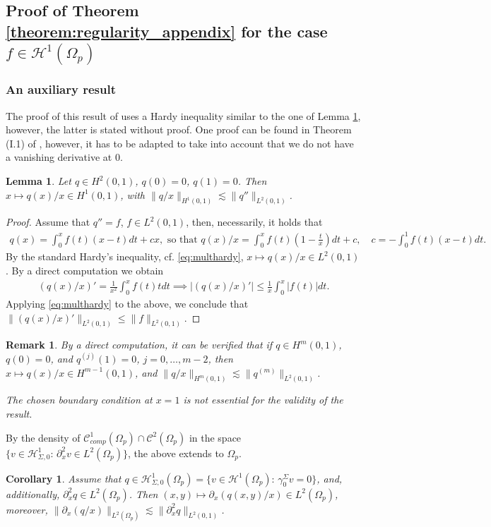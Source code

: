 \documentclass[report]{elsarticle}
\newtheorem{corollary}[theorem]{Corollary}
\newtheorem{lemma}[theorem]{Lemma}
\newtheorem{remark}[theorem]{Remark}
\numberwithin{theorem}{section}
\begin{document}
\subsection{Proof of Theorem \ref{theorem:regularity_appendix} for the case $f\in \mathcal{H}^1(\Omega_p)$}
\subsubsection{An auxiliary result}
The proof of this result of \cite{baouendi_goulaouic} uses a Hardy inequality similar to the one of Lemma \ref{lem:hardy_ho}, however, the latter is stated without proof. One proof can be found in Theorem (I.1) of \cite{baouendi}, however, it has to be adapted to take into account that we do not have a vanishing derivative at $0$.
\begin{lemma}
	\label{lem:hardy_ho}
	Let $q\in H^2(0,1)$, $q(0)=0$, $q(1)=0$. Then $x\mapsto q(x)/x\in H^1(0,1)$, with $\|q/x\|_{H^1(0,1)}\lesssim \|q''\|_{L^2(0,1)}$.
\end{lemma}
\begin{proof}
	Assume that $q''=f$, $f\in L^2(0,1)$, then, necessarily, it holds that 
	\begin{align*}
		q(x)=\int_0^x f(t)(x-t)dt+cx, \text{ so that }q(x)/x=\int_0^x f(t)\left(1-\frac{t}{x}\right)dt+c, \quad c=-\int_0^1f(t)(x-t)dt. 
	\end{align*}
By the standard Hardy's inequality, cf. \eqref{eq:multhardy}, $x\mapsto q(x)/x\in L^2(0,1)$. By a direct computation we obtain  
\begin{align*}
(q(x)/x)'=\frac{1}{x^2}\int_0^x f(t)tdt \implies |(q(x)/x)'|\leq \frac{1}{x}\int_0^x |f(t)|dt.
\end{align*}
Applying \eqref{eq:multhardy} to the above, we conclude that $\|(q(x)/x)'\|_{L^2(0,1)}\leq \|f\|_{L^2(0,1)}$.
\end{proof}
\begin{remark}
	By a direct computation, it can be verified that if $q\in H^m(0,1)$, $q(0)=0$, and $q^{(j)}(1)=0$, $j=0, \ldots, m-2$, then $x\mapsto q(x)/x\in H^{m-1}(0,1)$, and $\|q/x\|_{H^m(0,1)}\lesssim \|q^{(m)}\|_{L^2(0,1)}$. 
	
	The chosen boundary condition at $x=1$ is not essential for the validity of the result. 
\end{remark}
By the density of $\mathcal{C}^1_{comp}(\Omega_p)\cap\mathcal{C}^2(\Omega_p)$ in the space $\{v\in \mathcal{H}^1_{\Sigma,0}: \, \partial_x^2 v\in L^2(\Omega_p)\}$, the above extends to $\Omega_p$. 
\begin{corollary}
	\label{cor:dmp}
Assume that $q\in \mathcal{H}^1_{\Sigma,0}(\Omega_p)=\{v\in \mathcal{H}^1(\Omega_p): \, \gamma_0^{\Sigma}v=0\}$, and, additionally, $\partial_x^2 q\in L^2(\Omega_p)$. Then $(x,y)\mapsto \partial_x(q(x,y)/x)\in L^2(\Omega_p)$, moreover, $\|\partial_x (q/x)\|_{L^2(\Omega_p)}\lesssim \|\partial_x^2 q\|_{L^2(0,1)}$.
\end{corollary}
\end{document}
